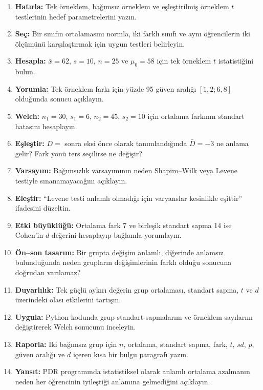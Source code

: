 \begin{enumerate}
\renewcommand{\labelenumi}{\textbf{\Alph{enumi}.}}
  \item \textbf{Hatırla:} Tek örneklem, bağımsız örneklem ve eşleştirilmiş örneklem $t$ testlerinin hedef parametrelerini yazın.
  \item \textbf{Seç:} Bir sınıfın ortalamasını normla, iki farklı sınıfı ve aynı öğrencilerin iki ölçümünü karşılaştırmak için uygun testleri belirleyin.
  \item \textbf{Hesapla:} $\bar x=62$, $s=10$, $n=25$ ve $\mu_0=58$ için tek örneklem $t$ istatistiğini bulun.
  \item \textbf{Yorumla:} Tek örneklem farkı için yüzde 95 güven aralığı $[1{,}2;6{,}8]$ olduğunda sonucu açıklayın.
  \item \textbf{Welch:} $n_1=30$, $s_1=6$, $n_2=45$, $s_2=10$ için ortalama farkının standart hatasını hesaplayın.
  \item \textbf{Eşleştir:} $D=$ sonra eksi önce olarak tanımlandığında $\bar D=-3$ ne anlama gelir? Fark yönü ters seçilirse ne değişir?
  \item \textbf{Varsayım:} Bağımsızlık varsayımının neden Shapiro--Wilk veya Levene testiyle sınanamayacağını açıklayın.
  \item \textbf{Eleştir:} ``Levene testi anlamlı olmadığı için varyanslar kesinlikle eşittir'' ifadesini düzeltin.
  \item \textbf{Etki büyüklüğü:} Ortalama fark 7 ve birleşik standart sapma 14 ise Cohen'in $d$ değerini hesaplayıp bağlamla yorumlayın.
  \item \textbf{Ön--son tasarım:} Bir grupta değişim anlamlı, diğerinde anlamsız bulunduğunda neden grupların değişimlerinin farklı olduğu sonucuna doğrudan varılamaz?
  \item \textbf{Duyarlılık:} Tek güçlü aykırı değerin grup ortalaması, standart sapma, $t$ ve $d$ üzerindeki olası etkilerini tartışın.
  \item \textbf{Uygula:} Python kodunda grup standart sapmalarını ve örneklem sayılarını değiştirerek Welch sonucunu inceleyin.
  \item \textbf{Raporla:} İki bağımsız grup için $n$, ortalama, standart sapma, fark, $t$, $sd$, $p$, güven aralığı ve $d$ içeren kısa bir bulgu paragrafı yazın.
  \item \textbf{Yansıt:} PDR programında istatistiksel olarak anlamlı ortalama azalmanın neden her öğrencinin iyileştiği anlamına gelmediğini açıklayın.
\end{enumerate}

